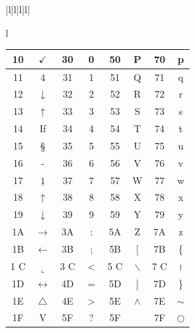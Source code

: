\documentclass[10pt]{book}
\begin{document}
\begin{center}
\begin{tabular}{|l|l|l|l|}
\begin{tabular}{l}
\begin{center}
\begin{tabular}{|c|c|c|c|c|c|c|c|}
\hline
10 & $\checkmark$ & 30 & 0 & 50 & P & 70 & p \\
\hline
11 & 4 & 31 & 1 & 51 & Q & 71 & q \\
\hline
12 & $\downarrow$ & 32 & 2 & 52 & R & 72 & r \\
\hline
13 & $\uparrow$ & 33 & 3 & 53 & S & 73 & s \\
\hline
14 & If & 34 & 4 & 54 & T & 74 & t \\
\hline
15 & § & 35 & 5 & 55 & U & 75 & u \\
\hline
16 & - & 36 & 6 & 56 & V & 76 & v \\
\hline
17 & $\underline{1}$ & 37 & 7 & 57 & W & 77 & w \\
\hline
18 & $\uparrow$ & 38 & 8 & 58 & X & 78 & x \\
\hline
19 & $\downarrow$ & 39 & 9 & 59 & Y & 79 & y \\
\hline
1A & $\rightarrow$ & 3A & : & 5A & Z & 7A & z \\
\hline
1B & $\leftarrow$ & 3B & ; & 5B & [ & 7B & \{ \\
\hline
1 C & $\llcorner$ & 3 C & < & 5 C & $\backslash$ & 7 C & । \\
\hline
1D & $\leftrightarrow$ & 4D & $=$ & 5D & ] & 7D & \} \\
\hline
1E & $\triangle$ & 4E & > & 5E & $\wedge$ & 7E & $\sim$ \\
\hline
1F & V & 5F & ? & 5F &  & 7F & $\bigcirc$ \\
\hline
\end{tabular}
\end{center}


\end{tabular}
\end{tabular}
\end{center}
\end{document}
